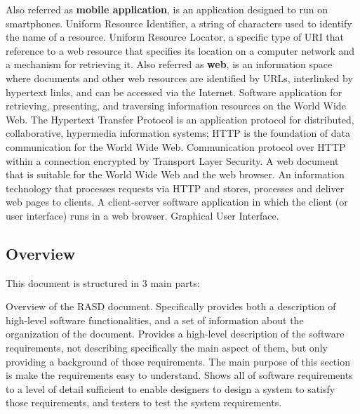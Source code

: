 \begin{itemize}
	 Also referred as \textbf{mobile application}, is an application designed to run on smartphones.
	 Uniform Resource Identifier, a string of characters used to identify the name of a resource.
	 Uniform Resource Locator, a specific type of URI that reference to a web resource that specifies its location on a computer network and a mechanism for retrieving it.
	 Also referred as \textbf{web}, is an information space where documents and other web resources are identified by URLs, interlinked by hypertext links, and can be accessed via the Internet.
	 Software application for retrieving, presenting, and traversing information resources on the World Wide Web.
	 The Hypertext Transfer Protocol is an application protocol for distributed, collaborative, hypermedia information systems; HTTP is the foundation of data communication for the World Wide Web.
	 Communication protocol over HTTP within a connection encrypted by Transport Layer Security.
	 A web document that is suitable for the World Wide Web and the web browser.
	 An information technology that processes requests via HTTP and stores, processes and deliver web pages to clients.
	 A client-server software application in which the client (or user interface) runs in a web browser.
	 Graphical User Interface.
\end{itemize}
\subsection{Overview}
This document is structured in 3 main parts:
\begin{itemize}
	 Overview of the RASD document. Specifically provides both a description of high-level software functionalities, and a set of information about the organization of the document.
	 Provides a high-level description of the software requirements, not describing specifically the main aspect of them, but only providing a background of those requirements. The main purpose of this section is make the requirements easy to understand.
	 Shows all of software requirements to a level of detail sufficient to enable designers to design a system to satisfy those requirements, and testers to test the system requirements.
\end{itemize}
